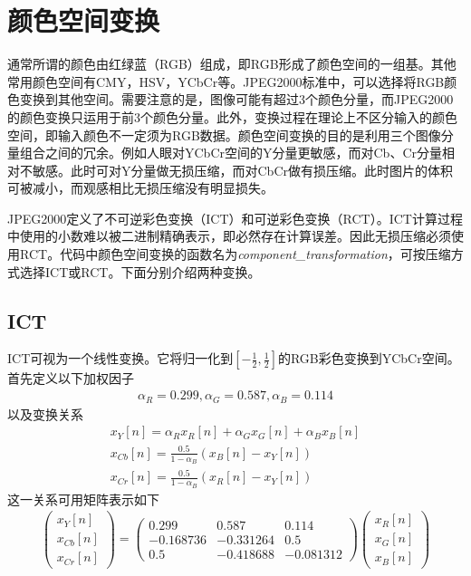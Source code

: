 \section{颜色空间变换}

通常所谓的颜色由红绿蓝（RGB）组成，即RGB形成了颜色空间的一组基。其他常用颜色空间有CMY，HSV，YCbCr等。JPEG2000标准中，可以选择将RGB颜色变换到其他空间。需要注意的是，图像可能有超过3个颜色分量，而JPEG2000的颜色变换只运用于前3个颜色分量。此外，变换过程在理论上不区分输入的颜色空间，即输入颜色不一定须为RGB数据。颜色空间变换的目的是利用三个图像分量组合之间的冗余。例如人眼对YCbCr空间的Y分量更敏感，而对Cb、Cr分量相对不敏感。此时可对Y分量做无损压缩，而对CbCr做有损压缩。此时图片的体积可被减小，而观感相比无损压缩没有明显损失。\par

JPEG2000定义了不可逆彩色变换（ICT）和可逆彩色变换（RCT）。ICT计算过程中使用的小数难以被二进制精确表示，即必然存在计算误差。因此无损压缩必须使用RCT。代码中颜色空间变换的函数名为\textit{component\_transformation}，可按压缩方式选择ICT或RCT。下面分别介绍两种变换。

\subsection{ICT}
ICT可视为一个线性变换。它将归一化到$\left[-\frac{1}{2}, \frac{1}{2}\right]$的RGB彩色变换到YCbCr空间。首先定义以下加权因子
\begin{equation}
\begin{aligned}
\alpha_R=0.299, \alpha_G=0.587,\alpha_B=0.114
\end{aligned}
\end{equation}
以及变换关系
\begin{equation}
\begin{aligned}
x_{Y}[n]=\alpha_{R}x_{R}[n]+\alpha_{G}x_{G}[n]+\alpha_{B}x_{B}[n]\\
x_{Cb}[n]=\frac{0.5}{1-\alpha_B}(x_{B}[n]-x_{Y}[n])\\
x_{Cr}[n]=\frac{0.5}{1-\alpha_B}(x_{R}[n]-x_{Y}[n])
\end{aligned}
\end{equation}
这一关系可用矩阵表示如下
\begin{equation}
\begin{aligned}
\left(
\begin{array}{c}
x_{Y}[n]\\
x_{Cb}[n]\\
x_{Cr}[n]
\end{array}
\right)
=
\left(
\begin{array}{ccc}
0.299 & 0.587 & 0.114\\
-0.168736 & -0.331264 & 0.5\\
0.5 & -0.418688 & -0.081312
\end{array}
\right)
\left(
\begin{array}{c}
x_{R}[n]\\
x_{G}[n]\\
x_{B}[n]
\end{array}
\right)
\end{aligned}
\end{equation}

